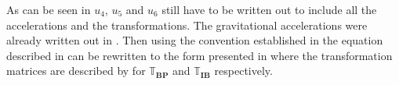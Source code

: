 
As can be seen in  $u_{4}$, $u_{5}$ and $u_{6}$ still have to be written out to include all the accelerations and the transformations. The gravitational accelerations were already written out in . Then using the convention established in  the equation described in  can be rewritten to the form presented in  where the transformation matrices are described by  for $\mathbb{T}_{\mathbf{BP}}$ and $\mathbb{T}_{\mathbf{IB}}$ respectively.

